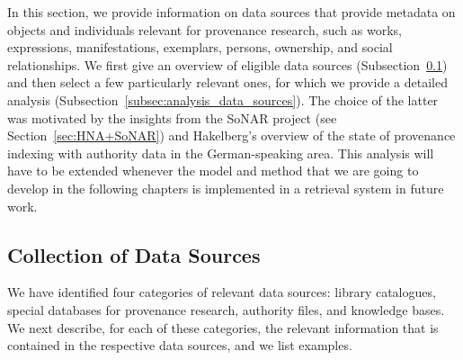 In this section, we provide information on data sources
that provide metadata on objects and individuals
relevant for provenance research, such as works, expressions, manifestations, exemplars,
persons, ownership, and social relationships.
We first give an overview of eligible data sources (Subsection~\ref{subsec:collection_data_sources})
and then select a few particularly relevant ones, for which we provide a detailed analysis
(Subsection~\ref{subsec:analysis_data_sources}).
The choice of the latter was motivated by the insights from the \gls{SoNAR} project (see Section~\ref{sec:HNA+SoNAR})
and Hakelberg's \autocite*[§4]{Hakelberg2016} overview of the state of provenance indexing with authority data
in the German-speaking area. This analysis will have to be extended
whenever the model and method that we are going to develop in the following chapters
is implemented in a retrieval system in future work.

\subsection{Collection of Data Sources}
\label{subsec:collection_data_sources}

We have identified four categories of relevant data sources:
library catalogues, special databases for provenance research, authority files, and knowledge bases.
We next describe, for each of these categories, the relevant information that is
contained in the respective data sources, and we list examples.


